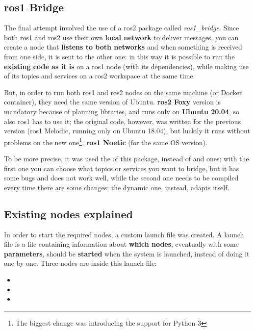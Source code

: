 \subsection{\acrshort{ros}1 Bridge}

The final attempt involved the use of a \acrshort{ros}2 package called \textit{ros1\_bridge}. Since both \acrshort{ros}1 and \acrshort{ros}2 use their own \textbf{local network} to deliver messages, you can create a node that \textbf{listens to both networks} and when something is received from one side, it is sent to the other one: in this way it is possible to run the \textbf{existing code as it is} on a \acrshort{ros}1 node (with its dependencies), while making use of its topics and services on a \acrshort{ros}2 workspace at the same time.

But, in order to run both \acrshort{ros}1 and \acrshort{ros}2 nodes on the same machine (or Docker container), they need the same version of Ubuntu. \textbf{\acrshort{ros}2 Foxy} version is mandatory because of planning libraries, and runs only on \textbf{Ubuntu 20.04}, so also \acrshort{ros}1 has to use it; the original code, however, was written for the previous version (\acrshort{ros}1 Melodic, running only on Ubuntu 18.04), but luckily it runs without problems on the new one\footnote{The biggest change was introducing the support for Python 3}, \textbf{\acrshort{ros}1 Noetic} (for the same OS version).

To be more precise, it was used the  of this package, instead of  and  ones: with the first one you can choose what topics or services you want to bridge, but it has some bugs and does not work well, while the second one needs to be compiled every time there are some changes; the dynamic one, instead, adapts itself.

\subsection{Existing nodes explained}
\label{subsec:nodes}

In order to start the required nodes, a custom launch file was created. A launch file is a file containing information about \textbf{which nodes}, eventually with some \textbf{parameters}, should be \textbf{started} when the system is launched, instead of doing it one by one. Three nodes are inside this launch file:

\begin{itemize}
    \item {}
    \item {}
    \item {}
\end{itemize}

